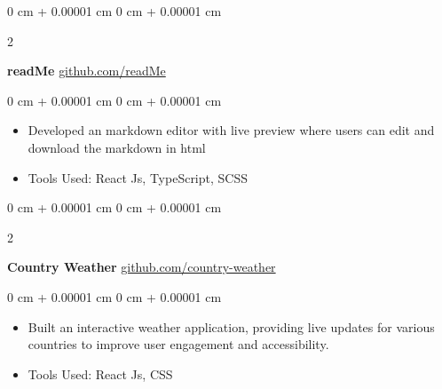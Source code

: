 \documentclass[10pt, letterpaper]{article}
\newenvironment{highlights}{
    \begin{itemize}[
        topsep=0.10 cm,
        parsep=0.10 cm,
        partopsep=0pt,
        itemsep=0pt,
        leftmargin=0 cm + 10pt
    ]
}{
    \end{itemize}
} %
\newenvironment{highlightsforbulletentries}{
    \begin{itemize}[
        topsep=0.10 cm,
        parsep=0.10 cm,
        partopsep=0pt,
        itemsep=0pt,
        leftmargin=10pt
    ]
}{
    \end{itemize}
} %
\newenvironment{onecolentry}{
    \begin{adjustwidth}{
        0 cm + 0.00001 cm
    }{
        0 cm + 0.00001 cm
    }
}{
    \end{adjustwidth}
} %
\newenvironment{twocolentry}[2][]{
    \onecolentry
    \def\secondColumn{#2}
    \setcolumnwidth{\fill, 4.5 cm}
    \begin{paracol}{2}
}{
    \switchcolumn \raggedleft \secondColumn
    \end{paracol}
    \endonecolentry
} %
\begin{document}
        
        \begin{twocolentry}{
            \href{https://github.com/glunkad/readMe}{github.com/readMe}
        }
            \textbf{readMe}\end{twocolentry}

        \vspace{0.10 cm}
        \begin{onecolentry}
            \begin{highlights}
                \item Developed an markdown editor with live preview where users can edit and download the markdown in html
                \item Tools Used: React Js, TypeScript, SCSS
            \end{highlights}
        \end{onecolentry}


        \vspace{0.2 cm}

        \begin{twocolentry}{
            \href{https://github.com/glunkad/fullstackopen/tree/main/part2/countryinfo/src}{github.com/country-weather}
        }
            \textbf{Country Weather}\end{twocolentry}

        \vspace{0.10 cm}
        \begin{onecolentry}
            \begin{highlights}
                \item Built an interactive weather application, providing live updates for various countries to improve user engagement and accessibility.
                \item Tools Used: React Js, CSS
            \end{highlights}
        \end{onecolentry}
    



\end{document}
